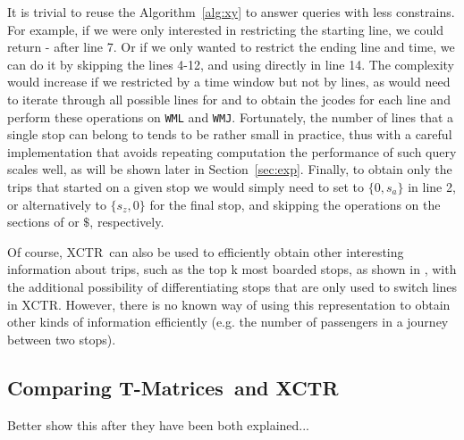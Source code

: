 \documentclass[runningheads]{llncs}
\newcommand{\acumm}{T-Matrices} %
\newcommand{\ctr}{XCTR}
\begin{document}
It is trivial to reuse the Algorithm~\ref{alg:xy} to answer queries with less constrains. For example, if we were only interested in restricting the starting line, we could return - after line 7. Or if we only wanted to restrict the ending line and time, we can do it by skipping the lines 4-12, and using directly  in line 14. The complexity would increase if we restricted by a time window but not by lines, as would need to iterate through all possible lines for  and  to obtain the jcodes for each line and perform these operations on \texttt{WML} and \texttt{WMJ}. Fortunately, the number of lines that a single stop can belong to tends to be rather small in practice, thus with a careful implementation that avoids repeating computation the performance of such query scales well, as will be shown later in Section~\ref{sec:exp}. Finally, to obtain only the trips that started on a given stop we would simply need to set  to $\{0,s_a\}$ in line 2, or alternatively to $\{s_z,0\}$ for the final stop, and skipping the operations on the sections of  or $\$$, respectively.

Of course, \ctr~can also be used to efficiently obtain other interesting information about trips, such as the top k most boarded stops, as shown in \cite{brisaboa2018compact}, with the additional possibility of differentiating stops that are only used to switch lines in \ctr. However, there is no known way of using this representation to obtain other kinds of information efficiently (e.g. the number of passengers in a journey between two stops).

\subsection{Comparing \acumm~and \ctr}
\label{sec:comp}
Better show this after they have been both explained... 
\end{document}
